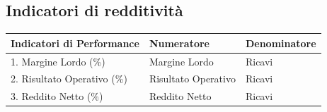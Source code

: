 \documentclass{article}
\begin{document}
\subsection{Indicatori di redditività}
\begin{center}
    \renewcommand{\arraystretch}{2}
    \begin{tabular}{|p{5cm}|p{5cm}|p{5cm}|}
        \hline 
        \textbf{Indicatori di Performance} & \textbf{Numeratore} & \textbf{Denominatore}\\
        \hline 
        1. Margine Lordo (\%) & Margine Lordo & Ricavi\\
        \hline 
        2. Risultato Operativo (\%) & Risultato Operativo & Ricavi\\
        \hline 
        3. Reddito Netto (\%) & Reddito Netto & Ricavi\\
        \hline 
    \end{tabular}
\end{center}
\end{document}

